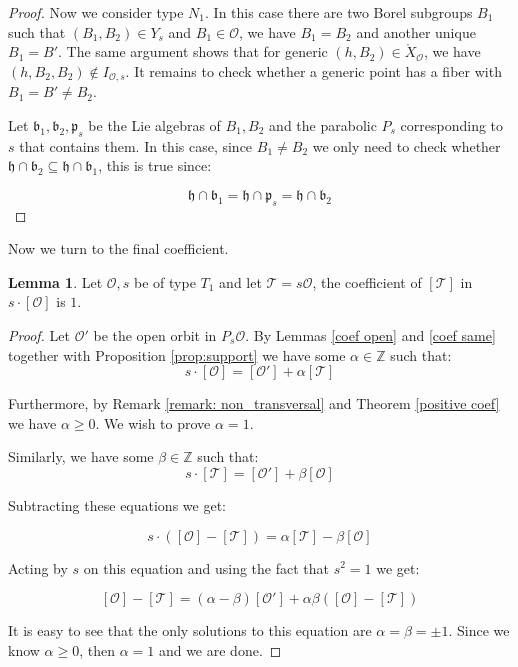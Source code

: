 \documentclass[12pt]{article}
\newcommand{\todo}[1]{{\color{red} TODO: #1}}
\newcommand{\s}{\mathcal{O}}
\newcommand{\Z}{\mathbb{Z}}
\theoremstyle{plain}
\theoremstyle{definition}
\newtheorem{lemma}[theorem]{Lemma}
\begin{document}
\begin{proof}


    Now we consider type $N_{1}$. In this case there are two Borel subgroups $B_{1}$ such that $(B_1,B_2)\in Y_s$ and $B_{1}\in \s$, we have $B_{1}=B_{2}$ and another unique $B_{1}=B'$. The same argument shows that for generic $(h,B_{2})\in \mathring{X}_{\mathcal{O}}$, we have $(h,B_2,B_2)\notin I_{\s,s}$. It remains to check whether a generic point has a fiber with $B_{1}=B'\neq B_2$. 
    
    Let $\mathfrak{b_1},\mathfrak{b_2},\mathfrak{p}_s$ be the Lie algebras of $B_1,B_2$ and the parabolic $P_s$ corresponding to $s$ that contains them.
    In this case, since $B_{1}\neq B_{2}$ we only need to check whether $\mathfrak{h}\cap \mathfrak{b}_{2}\subseteq \mathfrak{h} \cap \mathfrak{b}_{1}$, this is true since:

    $$ \mathfrak{h} \cap \mathfrak{b}_{1}=\mathfrak{h} \cap \mathfrak{p}_{s}=\mathfrak{h} \cap \mathfrak{b}_{2}$$
\end{proof}

Now we turn to the final coefficient.

\begin{lemma}
    Let $\mathcal{O},s$ be of type $T_{1}$ and let $\mathcal{T}=s\mathcal{O}$, the coefficient of $[\mathcal{T}]$ in ${s}\cdot[\mathcal{O}]$ is $1$.
\end{lemma}
\begin{proof}

    Let $\s'$ be the open orbit in $P_s\s$. By Lemmas \ref{coef open} and \ref{coef same} together with Proposition \ref{prop:support} we have some $\alpha\in \Z$ such that: $$s\cdot [\mathcal{O}]=[\mathcal{O}'] +\alpha[\mathcal{T}]$$
    
    Furthermore, by Remark \ref{remark: non_transversal} and Theorem \ref{positive coef} we have $\alpha \geq 0$. We wish to prove $\alpha =1$. 


    Similarly, we have some $\beta\in \Z$ such that:
    $$ s\cdot [\mathcal{T}]=[\mathcal{O}'] +\beta[\mathcal{O}]$$

    Subtracting these equations we get:

    $$ s \cdot ([\mathcal{O}]-[\mathcal{T}])= \alpha [\mathcal{T}] - \beta [\mathcal{O}]$$


    Acting by $s$ on this equation and using the fact that $s^2=1$ we get:

    $$ [\mathcal{O}]-[\mathcal{T}]= (\alpha - \beta)[\mathcal{O}'] + \alpha \beta ([\mathcal{O}] - [\mathcal{T}])$$

    It is easy to see that the only solutions to this equation are $\alpha =\beta = \pm 1$. Since we know $\alpha \geq 0$, then $\alpha =1$ and we are done.

    \end{proof}
\end{document}
